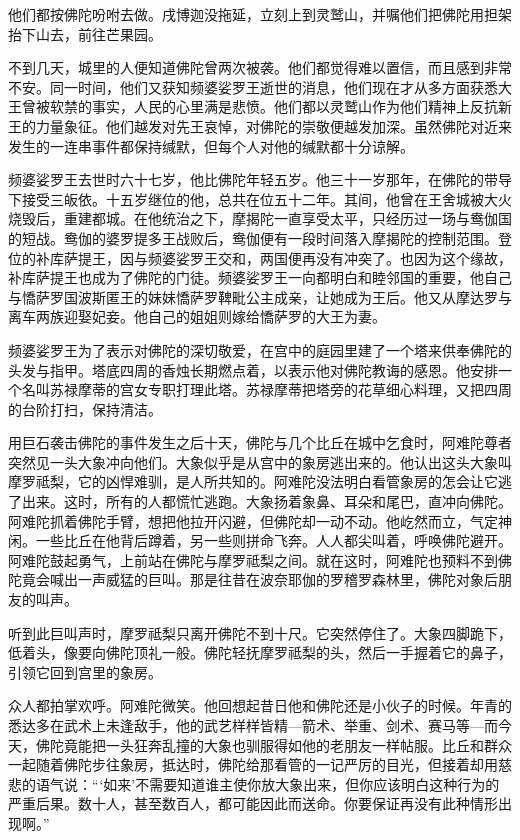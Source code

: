 \documentclass[12pt,twoside,openany]{book}
\begin{document}
他们都按佛陀吩咐去做。戌博迦没拖延，立刻上到灵鹫山，并嘱他们把佛陀用担架抬下山去，前往芒果园。

不到几天，城里的人便知道佛陀曾两次被袭。他们都觉得难以置信，而且感到非常不安。同一时间，他们又获知频婆娑罗王逝世的消息，他们现在才从多方面获悉大王曾被软禁的事实，人民的心里满是悲愤。他们都以灵鹫山作为他们精神上反抗新王的力量象征。他们越发对先王哀悼，对佛陀的崇敬便越发加深。虽然佛陀对近来发生的一连串事件都保持缄默，但每个人对他的缄默都十分谅解。

频婆娑罗王去世时六十七岁，他比佛陀年轻五岁。他三十一岁那年，在佛陀的带导下接受三皈依。十五岁继位的他，总共在位五十二年。其间，他曾在王舍城被大火烧毁后，重建都城。在他统治之下，摩揭陀一直享受太平，只经历过一场与鸯伽国的短战。鸯伽的婆罗提多王战败后，鸯伽便有一段时间落入摩揭陀的控制范围。登位的补库萨提王，因与频婆娑罗王交和，两国便再没有冲突了。也因为这个缘故，补库萨提王也成为了佛陀的门徒。频婆娑罗王一向都明白和睦邻国的重要，他自己与憍萨罗国波斯匿王的妹妹憍萨罗鞞毗公主成亲，让她成为王后。他又从摩达罗与离车两族迎娶妃妾。他自己的姐姐则嫁给憍萨罗的大王为妻。

频婆娑罗王为了表示对佛陀的深切敬爱，在宫中的庭园里建了一个塔来供奉佛陀的头发与指甲。塔底四周的香烛长期燃点着，以表示他对佛陀教诲的感恩。他安排一个名叫苏禄摩蒂的宫女专职打理此塔。苏禄摩蒂把塔旁的花草细心料理，又把四周的台阶打扫，保持清洁。

用巨石袭击佛陀的事件发生之后十天，佛陀与几个比丘在城中乞食时，阿难陀尊者突然见一头大象冲向他们。大象似乎是从宫中的象房逃出来的。他认出这头大象叫摩罗祗梨，它的凶悍难驯，是人所共知的。阿难陀没法明白看管象房的怎会让它逃了出来。这时，所有的人都慌忙逃跑。大象扬着象鼻、耳朵和尾巴，直冲向佛陀。阿难陀抓着佛陀手臂，想把他拉开闪避，但佛陀却一动不动。他屹然而立，气定神闲。一些比丘在他背后蹲着，另一些则拼命飞奔。人人都尖叫着，呼唤佛陀避开。阿难陀鼓起勇气，上前站在佛陀与摩罗祗梨之间。就在这时，阿难陀也预料不到佛陀竟会喊出一声威猛的巨叫。那是往昔在波奈耶伽的罗稽罗森林里，佛陀对象后朋友的叫声。

听到此巨叫声时，摩罗祗梨只离开佛陀不到十尺。它突然停住了。大象四脚跪下，低着头，像要向佛陀顶礼一般。佛陀轻抚摩罗祗梨的头，然后一手握着它的鼻子，引领它回到宫里的象房。

众人都拍掌欢呼。阿难陀微笑。他回想起昔日他和佛陀还是小伙子的时候。年青的悉达多在武术上未逢敌手，他的武艺样样皆精---箭术、举重、剑术、赛马等---而今天，佛陀竟能把一头狂奔乱撞的大象也驯服得如他的老朋友一样帖服。比丘和群众一起随着佛陀步往象房，抵达时，佛陀给那看管的一记严厉的目光，但接着却用慈悲的语气说：“‘如来’不需要知道谁主使你放大象出来，但你应该明白这种行为的严重后果。数十人，甚至数百人，都可能因此而送命。你要保证再没有此种情形出现啊。”
\end{document}
